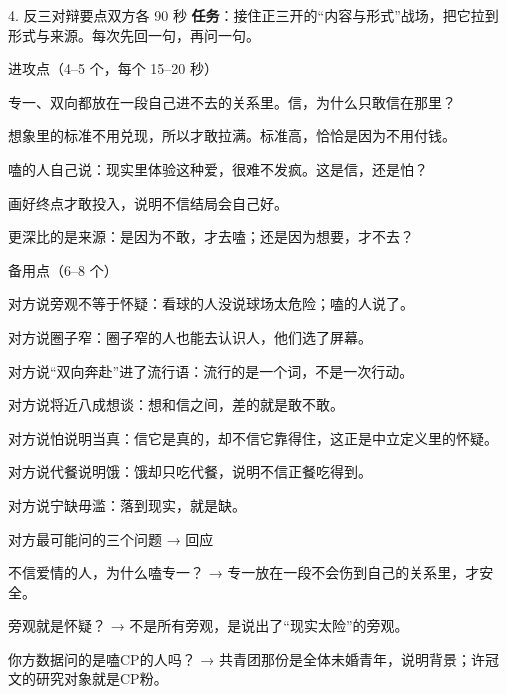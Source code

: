 \documentclass[script,con]{debate}
\begin{document}
\begin{stage}{4. 反三对辩要点}{双方各 90 秒}
\textbf{任务}：接住正三开的“内容与形式”战场，把它拉到形式与来源。每次先回一句，再问一句。
\begin{points}{进攻点（4–5 个，每个 15–20 秒）}
\item 专一、双向都放在一段自己进不去的关系里。信，为什么只敢信在那里？
\item 想象里的标准不用兑现，所以才敢拉满。标准高，恰恰是因为不用付钱。
\item 嗑的人自己说：现实里体验这种爱，很难不发疯。这是信，还是怕？
\item 画好终点才敢投入，说明不信结局会自己好。
\item 更深比的是来源：是因为不敢，才去嗑；还是因为想要，才不去？
\end{points}
\begin{points}{备用点（6–8 个）}
\item 对方说旁观不等于怀疑：看球的人没说球场太危险；嗑的人说了。
\item 对方说圈子窄：圈子窄的人也能去认识人，他们选了屏幕。
\item 对方说“双向奔赴”进了流行语：流行的是一个词，不是一次行动。
\item 对方说将近八成想谈：想和信之间，差的就是敢不敢。
\item 对方说怕说明当真：信它是真的，却不信它靠得住，这正是中立定义里的怀疑。
\item 对方说代餐说明饿：饿却只吃代餐，说明不信正餐吃得到。
\item 对方说宁缺毋滥：落到现实，就是缺。
\end{points}
\begin{points}{对方最可能问的三个问题 → 回应}
\item 不信爱情的人，为什么嗑专一？ → 专一放在一段不会伤到自己的关系里，才安全。
\item 旁观就是怀疑？ → 不是所有旁观，是说出了“现实太险”的旁观。
\item 你方数据问的是嗑CP的人吗？ → 共青团那份是全体未婚青年，说明背景；许冠文的研究对象就是CP粉。
\end{points}
\end{stage}
\end{document}
